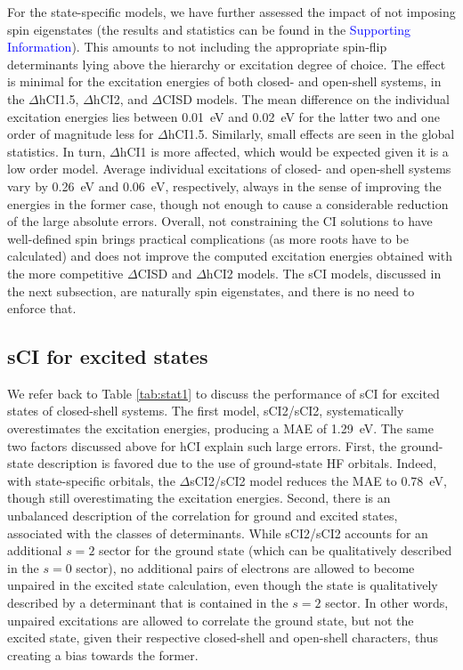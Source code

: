 \documentclass[aip,jcp,reprint,noshowkeys,superscriptaddress]{revtex4-1}
\newcommand{\SupInf}{\textcolor{blue}{Supporting Information}}
\begin{document}
For the state-specific models, we have further assessed the impact of not imposing spin eigenstates (the results and statistics can be found in the {\SupInf}).
This amounts to not including the appropriate spin-flip determinants lying above the hierarchy or excitation degree of choice.
The effect is minimal for the excitation energies of both closed- and open-shell systems, in the $\Delta$hCI1.5, $\Delta$hCI2, and $\Delta$CISD models.
The mean difference on the individual excitation energies lies between \SI{0.01}{\eV} and \SI{0.02}{\eV} for the latter two and one order of magnitude less for $\Delta$hCI1.5.
Similarly, small effects are seen in the global statistics.
In turn, $\Delta$hCI1 is more affected, which would be expected given it is a low order model.
Average individual excitations of closed- and open-shell systems vary by \SI{0.26}{\eV} and \SI{0.06}{\eV}, respectively, always in the sense of improving the energies in the former case,
though not enough to cause a considerable reduction of the large absolute errors.
Overall, not constraining the CI solutions to have well-defined spin brings practical complications (as more roots have to be calculated)
and does not improve the computed excitation energies obtained with the more competitive $\Delta$CISD and $\Delta$hCI2 models.
The sCI models, discussed in the next subsection, are naturally spin eigenstates, and there is no need to enforce that.

\subsection{sCI for excited states}
\label{sec:res_D}

We refer back to Table \ref{tab:stat1} to discuss the performance of sCI for excited states of closed-shell systems.
The first model, sCI2/sCI2, systematically overestimates the excitation energies, producing a MAE of \SI{1.29}{\eV}.
The same two factors discussed above for hCI explain such large errors.
First, the ground-state description is favored due to the use of ground-state HF orbitals.
Indeed, with state-specific orbitals, the $\Delta$sCI2/sCI2 model reduces the MAE to \SI{0.78}{\eV}, though still overestimating the excitation energies.
Second, there is an unbalanced description of the correlation for ground and excited states, associated with the classes of determinants.
While sCI2/sCI2 accounts for an additional $s=2$ sector for the ground state (which can be qualitatively described in the $s=0$ sector),
no additional pairs of electrons are allowed to become unpaired in the excited state calculation, even though the state is qualitatively described by a determinant that is contained in the $s=2$ sector.
In other words, unpaired excitations are allowed to correlate the ground state, but not the excited state, given their respective closed-shell and open-shell characters,
thus creating a bias towards the former.
\end{document}
